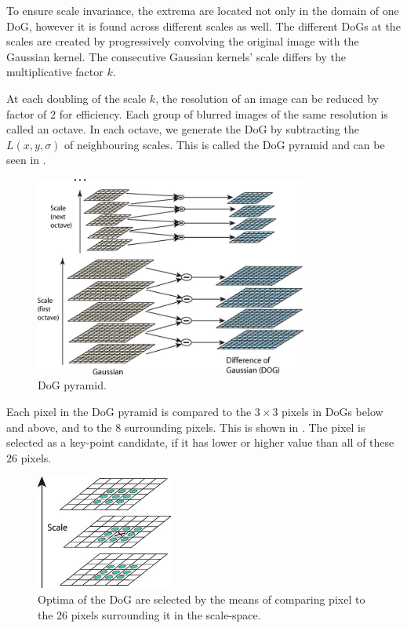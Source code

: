 To ensure scale invariance, the extrema are located not only in the domain of one DoG, however it is found across different scales as well. The different DoGs at the scales are created by progressively convolving the original image with the Gaussian kernel. The consecutive Gaussian kernels' scale differs by the multiplicative factor $k$.

At each doubling of the scale $k$, the resolution of an image can be reduced by factor of $2$ for efficiency. Each group of blurred images of the same resolution is called an octave. In each octave, we generate the DoG by subtracting the $L(x, y, \sigma)$ of neighbouring scales. This is called the DoG pyramid and can be seen in .

\begin{figure}
    \centering
    \includegraphics[width=0.8\textwidth]{Figures/sift/pyramid.jpg}
    \caption[DoG pyramid.]{DoG pyramid. \cite{Lowe2004}}
    \label{fig:DoG_pyramid}
\end{figure}

Each pixel in the DoG pyramid is compared to the $3\times3$ pixels in DoGs below and above, and to the $8$ surrounding pixels. This is shown in . The pixel is selected as a key-point candidate, if it has lower or higher value than all of these $26$ pixels.

\begin{figure}
    \centering
    \includegraphics[width=0.4\textwidth]{Figures/sift/extrema.jpg}
    \caption[Optima of the DoG are selected by the means of comparing pixel to the 26 pixels surrounding it in the scale-space.]{Optima of the DoG are selected by the means of comparing pixel to the 26 pixels surrounding it in the scale-space. \cite{Lowe2004}}
    \label{fig:DoG_extrema}
\end{figure}

